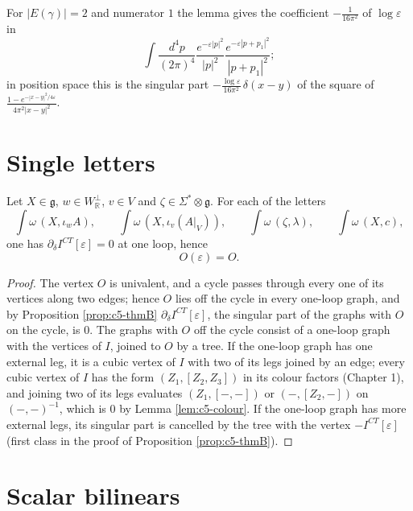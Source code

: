 For $|E(\gamma)|=2$ and numerator $1$ the lemma gives the coefficient $-\frac1{16\pi^2}$ of $\log\varepsilon$ in
\[
\int\frac{d^4p}{(2\pi)^4}\frac{e^{-\varepsilon|p|^2}}{|p|^2}\frac{e^{-\varepsilon|p+p_1|^2}}{|p+p_1|^2};
\]
in position space this is the singular part $-\frac{\log\varepsilon}{16\pi^2}\,\delta(x-y)$ of the square of $\frac{1-e^{-|x-y|^2/4\varepsilon}}{4\pi^2|x-y|^2}$.

\section{Single letters}

\begin{proposition}[Letters]
\label{prop:c5-letters}
Let $X\in\mathfrak g$, $w\in W_{\mathbb R}^\perp$, $v\in V$ and $\zeta\in\Sigma^*\otimes\mathfrak g$. For each of the letters
\[
\int\omega\,(X,\iota_wA),\qquad \int\omega\,(X,\iota_v(A|_V)),\qquad \int\omega\,(\zeta,\lambda),\qquad \int\omega\,(X,c),
\]
one has $\partial_\delta I^{CT}[\varepsilon]=0$ at one loop, hence
\begin{equation}
O(\varepsilon)=O .
\label{eq:c5-letters}
\end{equation}
\end{proposition}

\begin{proof}
The vertex $O$ is univalent, and a cycle passes through every one of its vertices along two edges; hence $O$ lies off the cycle in every one-loop graph, and by Proposition \ref{prop:c5-thmB} $\partial_\delta I^{CT}[\varepsilon]$, the singular part of the graphs with $O$ on the cycle, is $0$. The graphs with $O$ off the cycle consist of a one-loop graph with the vertices of $I$, joined to $O$ by a tree. If the one-loop graph has one external leg, it is a cubic vertex of $I$ with two of its legs joined by an edge; every cubic vertex of $I$ has the form $(Z_1,[Z_2,Z_3])$ in its colour factors (Chapter 1), and joining two of its legs evaluates $(Z_1,[-,-])$ or $(-,[Z_2,-])$ on $(-,-)^{-1}$, which is $0$ by Lemma \ref{lem:c5-colour}. If the one-loop graph has more external legs, its singular part is cancelled by the tree with the vertex $-I^{CT}[\varepsilon]$ (first class in the proof of Proposition \ref{prop:c5-thmB}).
\end{proof}

\section{Scalar bilinears}

